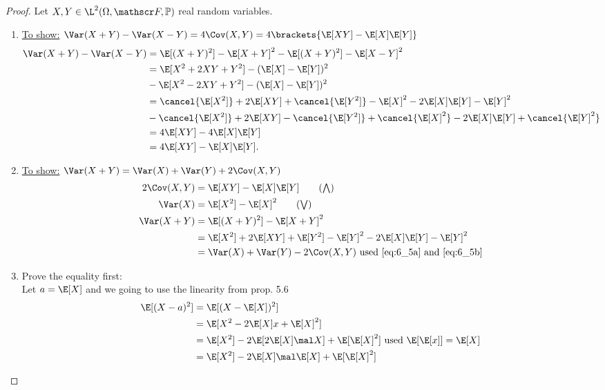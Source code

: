 \subsection{}
\begin{proof}
	Let $X,Y \in \L^2(\O, \F, \meas)$ real random variables.
	\begin{enumerate}
		\item \ul{To show:} $\Var(X+Y) - \Var(X-Y) = 4\Cov(X,Y) = 4\brackets{\E[XY] - \E[X]\E[Y]}$
		\begin{align*}
			\Var(X+Y)- \Var(X-Y) &= \E[(X+Y)^2]-\E[X+Y]^2 - \E[(X+Y)^2] - \E[X-Y]^2\\
			&= \E[X^2+2XY+Y^2] - (\E[X] - \E[Y])^2 \\&- \E[X^2-2XY+Y^2] - (\E[X] -\E[Y])^2\\
			&= \cancel{\E[X^2]} +2\E[XY] + \cancel{\E[Y^2]} - \E[X]^2 - 2\E[X]\E[Y] - \E[Y]^2\\
			&- \cancel{\E[X^2]} + 2\E[XY] - \cancel{\E[Y^2]} + \cancel{\E[X]^2} - 2\E[X]\E[Y] + \cancel{\E[Y]^2}\\
			&= 4\E[XY] - 4\E[X]\E[Y]\\
			&= 4\E[XY] - \E[X]\E[Y].
		\end{align*}
		\item \ul{To show:} $\Var(X+Y) = \Var(X) + \Var(Y) + 2\Cov(X,Y)$
		\begin{align*}
			2\Cov(X,Y) &= \E[XY] - \E[X]\E[Y] \label{eq:6_5a}\tag{$\bigwedge$}\\
			\Var(X) &= \E[X^2] - \E[X]^2 \label{eq:6_5b}\tag{$\bigvee$}\\
			\Var(X+Y) &= \E[(X+Y)^2] - \E[X+Y]^2\\
			&= \E[X^2] + 2\E[XY] + \E[Y^2] - \E[Y]^2 - 2\E[X]\E[Y] - \E[Y]^2\\
			&= \Var(X) + \Var(Y) - 2\Cov(X,Y) \text{ used \ref{eq:6_5a} and \ref{eq:6_5b}}\\
		\end{align*}
		\item Prove the equality first:\\
			Let $a = \E[X]$ and we going to use the linearity from prop. 5.6
			\begin{align*}
				\E[(X-a)^2] &= \E[(X-\E[X])^2]\\
				&= \E[X^2 -2\E[X]x + \E[X]^2]\\
				&= \E[X^2]-2\E[2\E[X]\mal X] + \E[\E[X]^2] \text{ used } \E[\E[x]] = \E[X]\\
				&= \E[X^2] - 2\E[X]\mal \E[X] + \E[\E[X]^2]\\

\end{align*}
\end{enumerate}
\end{proof}
